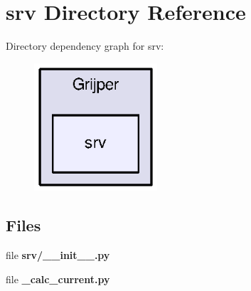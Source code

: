\section{srv Directory Reference}
\label{dir_5fb22578b18315cc8ffb635ab2517fcc}
Directory dependency graph for srv\-:\nopagebreak
\begin{figure}[H]
\begin{center}
\leavevmode
\includegraphics[width=130pt]{dir_5fb22578b18315cc8ffb635ab2517fcc_dep}
\end{center}
\end{figure}
\subsection*{Files}
\begin{DoxyCompactItemize}
\item 
file {\bf srv/\-\_\-\-\_\-init\-\_\-\-\_\-.\-py}
\item 
file {\bf \-\_\-calc\-\_\-current.\-py}
\end{DoxyCompactItemize}
